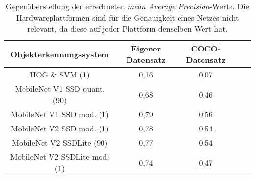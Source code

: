 \begin{table}[H]
	\caption{Gegenüberstellung der errechneten \textit{mean Average Precision}-Werte. Die Hardwareplattformen sind für die Genauigkeit eines Netzes nicht relevant, da diese auf jeder Plattform denselben Wert hat.  }
	\begin{center}
		
		\begin{tabular}{|c|c|c|c|c|}
			\hline
			\multicolumn{1}{|c|}{Objekterkennungssystem} & \multicolumn{1}{c|}{Eigener Datensatz} & \multicolumn{1}{c|}{COCO-Datensatz} \\ \hline
			HOG \& SVM (1)	& 0,16	& 0,07		 \\
			MobileNet V1 SSD quant. (90)			&0,68	&0,46	 	 \\
			MobileNet V1 SSD mod. (1)		&0,79	&0,56	 \\
			MobileNet V2 SSD mod. (1)	&0,78 &0,54  \\
			MobileNet V2 SSDLite (90)			&0,77	& 0,54	 \\
			MobileNet V2 SSDLite mod. (1)			&0,74	&0,47	 \\
			
			\hline
		\end{tabular}
	\end{center}

	\label{fig: genauigkeiten}
\end{table}